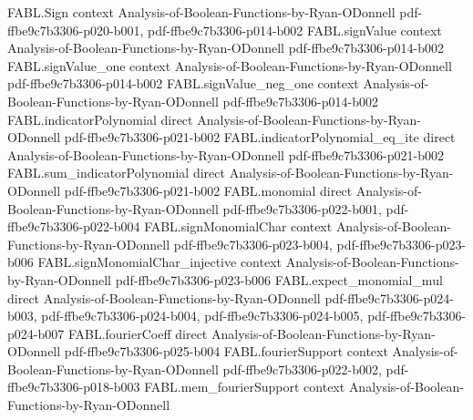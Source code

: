 \begin{theorem}
\label{FABL.fourierCoeff_majority_odd_insert_last}
\leanok
{}
\proofstep
  {FABL.Sign}
  {context}
  {Analysis-of-Boolean-Functions-by-Ryan-ODonnell}
  {pdf-ffbe9c7b3306-p020-b001,
    pdf-ffbe9c7b3306-p014-b002}
\proofstep
  {FABL.signValue}
  {context}
  {Analysis-of-Boolean-Functions-by-Ryan-ODonnell}
  {pdf-ffbe9c7b3306-p014-b002}
\proofstep
  {FABL.signValue_one}
  {context}
  {Analysis-of-Boolean-Functions-by-Ryan-ODonnell}
  {pdf-ffbe9c7b3306-p014-b002}
\proofstep
  {FABL.signValue_neg_one}
  {context}
  {Analysis-of-Boolean-Functions-by-Ryan-ODonnell}
  {pdf-ffbe9c7b3306-p014-b002}
\proofstep
  {FABL.indicatorPolynomial}
  {direct}
  {Analysis-of-Boolean-Functions-by-Ryan-ODonnell}
  {pdf-ffbe9c7b3306-p021-b002}
\proofstep
  {FABL.indicatorPolynomial_eq_ite}
  {direct}
  {Analysis-of-Boolean-Functions-by-Ryan-ODonnell}
  {pdf-ffbe9c7b3306-p021-b002}
\proofstep
  {FABL.sum_indicatorPolynomial}
  {direct}
  {Analysis-of-Boolean-Functions-by-Ryan-ODonnell}
  {pdf-ffbe9c7b3306-p021-b002}
\proofstep
  {FABL.monomial}
  {direct}
  {Analysis-of-Boolean-Functions-by-Ryan-ODonnell}
  {pdf-ffbe9c7b3306-p022-b001,
    pdf-ffbe9c7b3306-p022-b004}
\proofstep
  {FABL.signMonomialChar}
  {context}
  {Analysis-of-Boolean-Functions-by-Ryan-ODonnell}
  {pdf-ffbe9c7b3306-p023-b004,
    pdf-ffbe9c7b3306-p023-b006}
\proofstep
  {FABL.signMonomialChar_injective}
  {context}
  {Analysis-of-Boolean-Functions-by-Ryan-ODonnell}
  {pdf-ffbe9c7b3306-p023-b006}
\proofstep
  {FABL.expect_monomial_mul}
  {direct}
  {Analysis-of-Boolean-Functions-by-Ryan-ODonnell}
  {pdf-ffbe9c7b3306-p024-b003,
    pdf-ffbe9c7b3306-p024-b004,
    pdf-ffbe9c7b3306-p024-b005,
    pdf-ffbe9c7b3306-p024-b007}
\proofstep
  {FABL.fourierCoeff}
  {direct}
  {Analysis-of-Boolean-Functions-by-Ryan-ODonnell}
  {pdf-ffbe9c7b3306-p025-b004}
\proofstep
  {FABL.fourierSupport}
  {context}
  {Analysis-of-Boolean-Functions-by-Ryan-ODonnell}
  {pdf-ffbe9c7b3306-p022-b002,
    pdf-ffbe9c7b3306-p018-b003}
\proofstep
  {FABL.mem_fourierSupport}
  {context}
  {Analysis-of-Boolean-Functions-by-Ryan-ODonnell}

\end{theorem}
